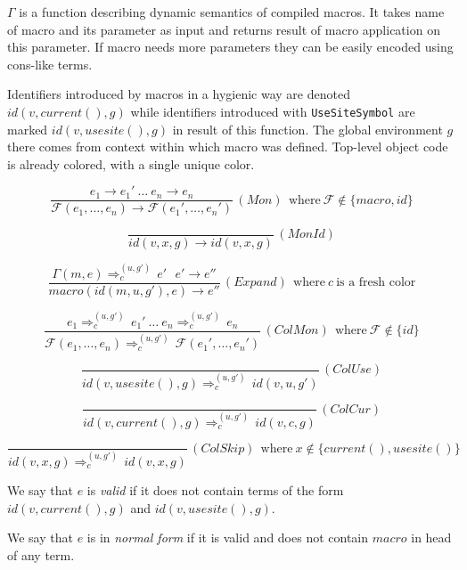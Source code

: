\documentclass{llncs}
\newcommand{\infrule}[3]{
  \displaystyle
  \frac{#1}{#2}
  \, #3
}
\newcommand{\nf}[2]{#1 \rightarrow #2}
\newcommand{\colr}[2]{#1 \Rightarrow^{(u, g')}_{c} \, #2}
\begin{document}
$\Gamma$ is a function describing dynamic semantics of compiled macros.
It takes name of macro and its parameter as input and returns result of
macro application on this parameter. If macro needs more parameters they
can be easily encoded using cons-like terms.

Identifiers introduced by macros in a hygienic way are denoted
$id(v,current(),g)$ while identifiers introduced with \verb,UseSiteSymbol,
are marked $id(v,usesite(),g)$ in result of this function. The
global environment $g$ there comes from context within which macro
was defined. Top-level object code is already colored, with a single
unique color.


$$
  \infrule{
    \nf{e_1}{e_1'} \ \ldots\ \nf{e_n}{e_n}
  }{
    \nf{
      \mathcal{F}(e_1, \ldots, e_n)
    }{
      \mathcal{F}(e_1', \ldots, e_n')
    }
  }{(Mon) \ \ \textrm{where}\ \mathcal{F} \notin \{ macro, id \}}
$$

$$
  \infrule{
  }{
    \nf{
      id (v, x, g)
    }{
      id (v, x, g)
    }
  }{(MonId)}
$$

$$
  \infrule{
    \colr{\Gamma(m,e)}{e'} \ \ \ \nf{e'}{e''}
  }{
    \nf{
      macro (id(m, u, g'), e)
    }{
      e''
    }
  }{(Expand) \ \ \textrm{where}\ c \ \textrm{is\ a\ fresh\ color}}
$$

$$
  \infrule{
    \colr{e_1}{e_1'} \ \ldots\ \colr{e_n}{e_n}
  }{
    \colr{
      \mathcal{F}(e_1, \ldots, e_n)
    }{
      \mathcal{F}(e_1', \ldots, e_n')
    }
  }{(ColMon)\ \ \textrm{where}\ \mathcal{F} \notin \{ id \}}
$$

$$
  \infrule{
  }{
    \colr{
      id (v, usesite (), g)
    }{
      id (v, u, g')
    }
  }{(ColUse)}
$$

$$
  \infrule{
  }{
    \colr{
      id (v, current (), g)
    }{
      id (v, c, g)
    }
  }{(ColCur)}
$$

$$
  \infrule{
  }{
    \colr{
      id (v, x, g)
    }{
      id (v, x, g)
    }
  }{(ColSkip)\ \ \textrm{where}\ x \notin \{ current (), usesite () \}}
$$

\begin{definition}
We say that $e$ is \emph{valid} if it does not
contain terms of the form $id(v, current(), g)$ and $id(v, usesite(), g)$.
\end{definition}

\begin{definition}
We say that $e$ is in \emph{normal form} if it is
valid and does not contain $macro$ in head of any term.
\end{definition}
\end{document}
